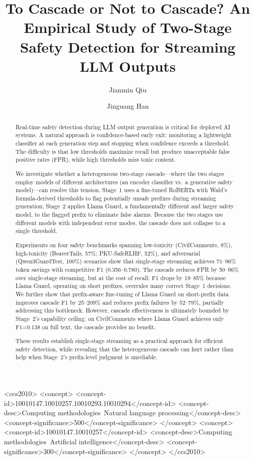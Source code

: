 \documentclass[acmtjournal, acmnowidth]{acmart}
\title{To Cascade or Not to Cascade? An Empirical Study of Two-Stage Safety Detection for Streaming LLM Outputs}
\author{Jianmin Qiu}
\affiliation{
  \institution{Southeast University}
  \city{Nanjing}
  \country{China}
}
\author{Jinguang Han}
\affiliation{
  \institution{Southeast University}
  \city{Nanjing}
  \country{China}
}
\theoremstyle{definition}
\begin{document}
\begin{abstract}
Real-time safety detection during LLM output generation is critical for deployed AI systems.
A natural approach is confidence-based early exit: monitoring a lightweight classifier at each generation step and stopping when confidence exceeds a threshold.
The difficulty is that low thresholds maximize recall but produce unacceptable false positive rates (FPR), while high thresholds miss toxic content.

We investigate whether a heterogeneous two-stage cascade---where the two stages employ models of different architectures (an encoder classifier vs.\ a generative safety model)---can resolve this tension.
Stage~1 uses a fine-tuned RoBERTa with Wald's formula-derived thresholds to flag potentially unsafe prefixes during streaming generation; Stage~2 applies Llama Guard, a fundamentally different and larger safety model, to the flagged prefix to eliminate false alarms.
Because the two stages use different models with independent error modes, the cascade does not collapse to a single threshold.

Experiments on four safety benchmarks spanning low-toxicity (CivilComments, 8\%), high-toxicity (BeaverTails, 57\%; PKU-SafeRLHF, 52\%), and adversarial (Qwen3GuardTest, 100\%) scenarios show that single-stage streaming achieves 71--96\% token savings with competitive F1 (0.356--0.780).
The cascade reduces FPR by 50--96\% over single-stage streaming, but at the cost of recall: F1 drops by 19--85\% because Llama Guard, operating on short prefixes, overrules many correct Stage~1 decisions.
We further show that prefix-aware fine-tuning of Llama Guard on short-prefix data improves cascade F1 by 25--209\% and reduces prefix failures by 52--79\%, partially addressing this bottleneck.
However, cascade effectiveness is ultimately bounded by Stage~2's capability ceiling: on CivilComments where Llama Guard achieves only F1=0.138 on full text, the cascade provides no benefit.

These results establish single-stage streaming as a practical approach for efficient safety detection, while revealing that the heterogeneous cascade can hurt rather than help when Stage~2's prefix-level judgment is unreliable.

\end{abstract}

\begin{CCSXML}
<ccs2010>
<concept>
<concept-id>10010147.10010257.10010293.10010294</concept-id>
<concept-desc>Computing methodologies~Natural language processing</concept-desc>
<concept-significance>500</concept-significance>
</concept>
<concept>
<concept-id>10010147.10010257</concept-id>
<concept-desc>Computing methodologies~Artificial intelligence</concept-desc>
<concept-significance>300</concept-significance>
</concept>
</ccs2010>
\end{CCSXML}
\end{document}
